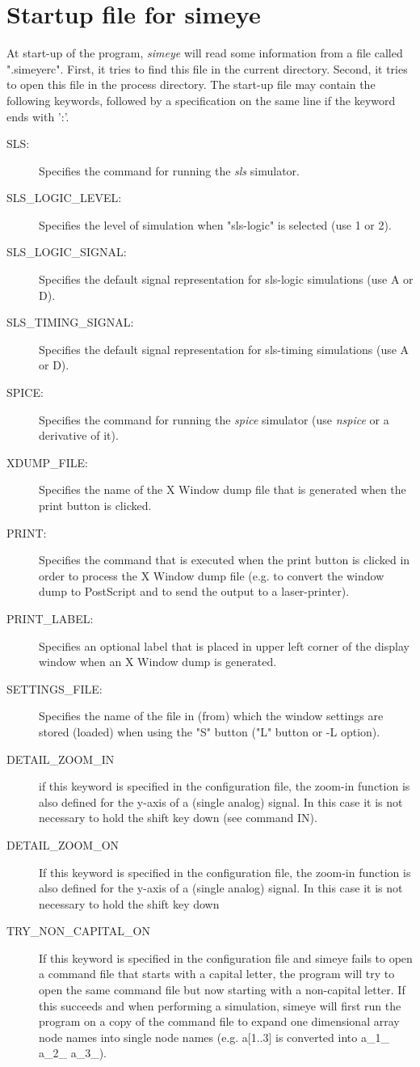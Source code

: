 \section{Startup file for simeye}
At start-up of the program,
{\it simeye}
will read some information from a file called ".simeyerc".
First, it tries to find this file in the current directory.
Second, it tries to open this file in the process directory.
The start-up file may contain the following keywords, followed
by a specification on the same line if the keyword ends with ':'.
\begin{description}
\item[SLS:]
Specifies the command for running the
{\it sls}
simulator.
\item[SLS\_LOGIC\_LEVEL:]
Specifies the level of simulation when "sls-logic" is selected
(use 1 or 2).
\item[SLS\_LOGIC\_SIGNAL:]
Specifies the default signal representation for sls-logic simulations
(use A or D).
\item[SLS\_TIMING\_SIGNAL:]
Specifies the default signal representation for sls-timing simulations
(use A or D).
\item[SPICE:]
Specifies the command for running the
{\it spice}
simulator (use
{\it nspice}
or a derivative of it).
\item[XDUMP\_FILE:]
Specifies the name of the X Window dump file that is generated
when the print button is clicked.
\item[PRINT:]
Specifies the command that is executed when the print button is clicked
in order to process the X Window dump file (e.g. to convert the window dump to
PostScript and to send the output to a laser-printer).
\item[PRINT\_LABEL:]
Specifies an optional label that is placed in upper
left corner of the display window when an X Window dump
is generated.
\item[SETTINGS\_FILE:]
Specifies the name of the file in (from) which the window
settings are stored (loaded) when using the "S"
button ("L" button or -L option).
\item[DETAIL\_ZOOM\_IN]
          if this keyword is specified in the configuration file,
          the zoom-in function is also defined for the y-axis of
          a (single analog) signal.  In this case it is not
          necessary to hold the shift key down (see command IN).
\item[DETAIL\_ZOOM\_ON]
If this keyword is specified in the configuration file,
the zoom-in function is also defined for the
y-axis of a (single analog) signal.
In this case it is not necessary to hold the shift key down
\item[TRY\_NON\_CAPITAL\_ON]
If this keyword is specified in the configuration file
and simeye fails to open a command file that starts with a capital letter,
the program will try to open the same command file but now starting
with a non-capital letter.
If this succeeds and
when performing a simulation, simeye will first run the program
on a copy of the command file
to expand one dimensional array node names into single node names
(e.g. a[1..3] is converted into a\_1\_ a\_2\_ a\_3\_).
\end{description}
